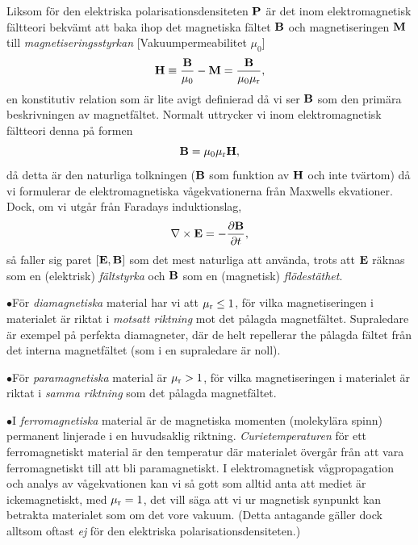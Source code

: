 Liksom f{\"o}r den elektriska polarisationsdensiteten ${\bf P}$ {\"a}r det
inom elektromagnetisk f{\"a}ltteori bekv{\"a}mt att baka ihop det magnetiska
f{\"a}ltet ${\bf B}$ och magnetiseringen ${\bf M}$ till
{\it magnetiseringsstyrkan}
[Vakuumpermeabilitet $\mu_0$]
$$
  {\bf H}\equiv{{\bf B}\over{\mu_0}}-{\bf M}
    ={{\bf B}\over{\mu_0\mu_{\rm r}}},
$$
en konstitutiv relation som {\"a}r lite avigt definierad d{\aa} vi ser ${\bf B}$
som den prim{\"a}ra beskrivningen av magnetf{\"a}ltet. Normalt uttrycker vi inom
elektromagnetisk f{\"a}ltteori denna p{\aa} formen
$$
  {\bf B}=\mu_0\mu_{\rm r}{\bf H},
$$
d{\aa} detta {\"a}r den naturliga tolkningen (${\bf B}$ som funktion av
${\bf H}$ och inte tv{\"a}rtom) d{\aa} vi formulerar de elektromagnetiska
v{\aa}gekvationerna fr{\aa}n Maxwells ekvationer. Dock, om vi utg{\aa}r
fr{\aa}n Faradays induktionslag,
$$
  \nabla\times{\bf E}=-{{\partial{\bf B}}\over{\partial t}},
$$
s{\aa} faller sig paret $[{\bf E},{\bf B}]$ som det mest naturliga att
anv{\"a}nda, trots att ${\bf E}$ r{\"a}knas som en (elektrisk)
{\it f{\"a}ltstyrka} och ${\bf B}$ som en (magnetisk) {\it fl{\"o}dest{\"a}thet}.
\medskip
\item{$\bullet$}{F{\"o}r {\it diamagnetiska} material 
   har vi att $\mu_{\rm r}\le 1$, f{\"o}r vilka magnetiseringen i materialet
   {\"a}r riktat i {\it motsatt riktning} mot det p{\aa}lagda magnetf{\"a}ltet.
   Supraledare {\"a}r exempel p{\aa} perfekta diamagneter, d{\"a}r de helt
   repellerar the p{\aa}lagda f{\"a}ltet fr{\aa}n det interna magnetf{\"a}ltet
   (som i en supraledare {\"a}r noll).}
\item{$\bullet$}{F{\"o}r {\it paramagnetiska} material 
   {\"a}r $\mu_{\rm r}>1$, f{\"o}r vilka magnetiseringen i materialet {\"a}r
   riktat i {\it samma riktning} som det p{\aa}lagda magnetf{\"a}ltet.}
\item{$\bullet$}{I {\it ferromagnetiska} material 
   {\"a}r de magnetiska momenten (molekyl{\"a}ra spinn) permanent linjerade
   i en huvudsaklig riktning. {\it Curietemperaturen} 
   f{\"o}r ett ferromagnetiskt material {\"a}r den temperatur d{\"a}r
   materialet {\"o}verg{\aa}r fr{\aa}n att vara ferromagnetiskt till att
   bli paramagnetiskt.}
\medskip
\noindent
I elektromagnetisk v{\aa}gpropagation och analys av v{\aa}gekvationen kan vi
s{\aa} gott som alltid anta att mediet {\"a}r ickemagnetiskt, med
$\mu_{\rm r}=1$, det vill s{\"a}ga att vi ur magnetisk synpunkt kan betrakta
materialet som om det vore vakuum. (Detta antagande g{\"a}ller dock alltsom
oftast {\it ej} f{\"o}r den elektriska polarisationsdensiteten.)

